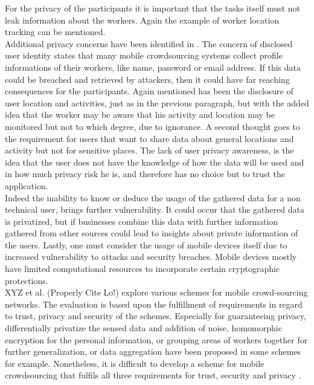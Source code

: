 \documentclass[a4paper,12pt]{report}
\begin{document}
			For the privacy of the participants it is important that the tasks itself must not leak information about the workers. 
			Again the example of worker location tracking can be mentioned.\\
			Additional privacy concerns have been identified in \cite{PrivacyAwareMCS}. 
			The concern of disclosed user identity states that many mobile crowdsourcing systems collect profile informations of their workers, like name, password or email address. 
			If this data could be breached and retrieved by attackers, then it could have far reaching consequences for the participants. 
			Again mentioned has been the disclosure of user location and activities, just as in the previous paragraph, but with the added idea that the worker may be aware that his activity and location may be monitored but not to which degree, due to ignorance. 
			A second thought goes to the requirement for users that want to share data about general locations and activity but not for sensitive places. 
			The lack of user privacy awareness, is the idea that the user does not have the knowledge of how the data will be used and in how much privacy risk he is, and therefore has no choice but to trust the application.\\
			Indeed the inability to know or deduce the usage of the gathered data for a non technical user, brings further vulnerability. 
			It could occur that the gathered data is privatized, but if businesses combine this data with further information gathered from other sources could lead to insights about private information of the users. 
			Lastly, one must consider the usage of mobile devices itself due to increased vulnerability to attacks and security breaches. 
			Mobile devices mostly have limited computational resources to incorporate certain cryptographic protections.\\
			XYZ et al. (Properly Cite Lo!) explore various schemes for mobile crowd-sourcing networks. 
			The evaluation is based upon the fulfillment of requirements in regard to trust, privacy and security of the schemes. 
			Especially for guaranteeing privacy, differentially privatize the sensed data and addition of noise, homomorphic encryption for the personal information, or grouping areas of workers together for further generalization, or data aggregation have been proposed in some schemes for example. 
			Nonetheless, it is difficult to develop a scheme for mobile crowdsourcing that fulfils all three requirements for trust, security and privacy \cite{SecPriTrustMCS}.
		\closesection
	\closesection
\end{document}
